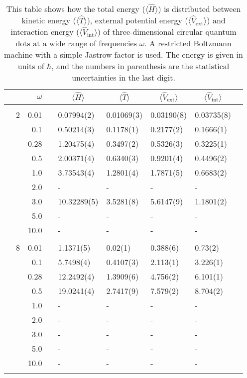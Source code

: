 \begin{table}[H]
	\caption{This table shows how the total energy ($\langle\hat{H}\rangle$) is distributed between kinetic energy ($\langle\hat{T}\rangle$), external potential energy ($\langle\hat{V}_{\text{ext}}\rangle$) and interaction energy ($\langle\hat{V}_{\text{int}}\rangle$) of three-dimensional circular quantum dots at a wide range of frequencies $\omega$. A restricted Boltzmann machine with a simple Jastrow factor is used. The energy is given in units of $\hbar$, and the numbers in parenthesis are the statistical uncertainties in the last digit.}
	\label{tab:splitfrequencyQDRBMSJ3D}
	\begin{tabularx}{\textwidth}{R{1cm}rrcR{2.3cm}R{2.3cm}R{2.3cm}R{2.3cm}R{1cm}} \hline\hline
		&\makecell{\\ \phantom{$N$} \\ \phantom{=}} & $\omega$ &&  &  &  &  \\ \hline \\
		&2 & 0.01 && 0.07994(2) & 0.01069(3) & 0.03190(8) & 0.03735(8) \\
		&& 0.1 && 0.50214(3) & 0.1178(1) & 0.2177(2) & 0.1666(1) \\
		&& 0.28 && 1.20475(4) & 0.3497(2) & 0.5326(3) & 0.3225(1) \\
		&& 0.5 && 2.00371(4) & 0.6340(3) & 0.9201(4) & 0.4496(2) \\
		&& 1.0 && 3.73543(4) & 1.2801(4) & 1.7871(5) & 0.6683(2) \\
		&& 2.0 && - & - & - & -\\
		&& 3.0 && 10.32289(5) & 3.5281(8) & 5.6147(9) & 1.1801(2) \\ 
		&& 5.0 && - & - & - & -\\
		&& 10.0 && - & - & - & -\\
		\hdashline \\
		
		&8 & 0.01 && 1.1371(5) & 0.02(1) & 0.388(6) & 0.73(2) \\
		&& 0.1 && 5.7498(4) & 0.4107(3) & 2.113(1) & 3.226(1) \\
		&& 0.28 && 12.2492(4) & 1.3909(6) & 4.756(2) & 6.101(1) \\
		&& 0.5 && 19.0241(4) & 2.7417(9) & 7.579(2) & 8.704(2) \\
		&& 1.0 && - & - & - & - \\
		&& 2.0 && - & - & - & -\\
		&& 3.0 && - & - & - & - \\ 
		&& 5.0 && - & - & - & -\\
		&& 10.0 && - & - & - & -\\
		\hdashline \\
		

\end{tabularx}
\end{table}
